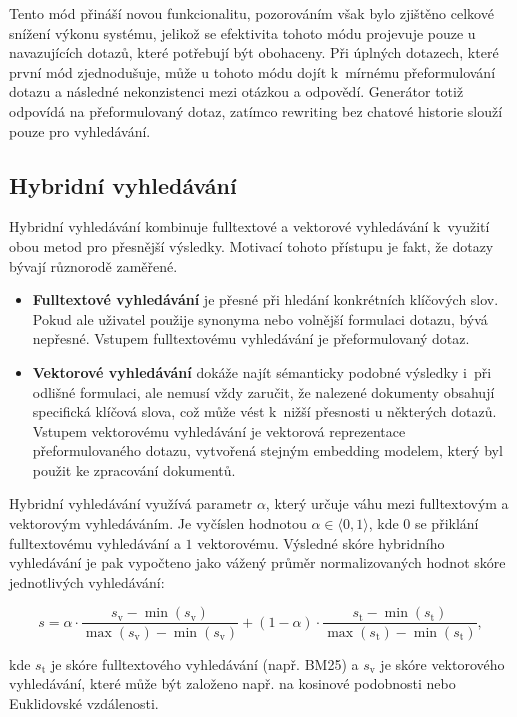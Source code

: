 Tento mód přináší novou funkcionalitu, pozorováním však bylo zjištěno celkové snížení výkonu systému, jelikož se efektivita tohoto módu projevuje pouze u navazujících dotazů, které potřebují být obohaceny. Při úplných dotazech, které první mód zjednodušuje, může u tohoto módu dojít k~mírnému přeformulování dotazu a následné nekonzistenci mezi otázkou a odpovědí. Generátor totiž odpovídá na přeformulovaný dotaz, zatímco rewriting bez chatové historie slouží pouze pro vyhledávání.

\subsection{Hybridní vyhledávání}
\label{hybrid}
Hybridní vyhledávání kombinuje fulltextové a vektorové vyhledávání k~využití obou metod pro přesnější výsledky. Motivací tohoto přístupu je fakt, že dotazy bývají různorodě zaměřené. 
\begin{itemize}
    \item \textbf{Fulltextové vyhledávání} je přesné při hledání konkrétních klíčových slov. Pokud ale uživatel použije synonyma nebo volnější formulaci dotazu, bývá nepřesné. Vstupem fulltextovému vyhledávání je přeformulovaný dotaz.
    \item \textbf{Vektorové vyhledávání} dokáže najít sémanticky podobné výsledky i~při odlišné formulaci, ale nemusí vždy zaručit, že nalezené dokumenty obsahují specifická klíčová slova, což může vést k~nižší přesnosti u některých dotazů. Vstupem vektorovému vyhledávání je vektorová reprezentace přeformulovaného dotazu, vytvořená stejným embedding modelem, který byl použit ke zpracování dokumentů.
\end{itemize}
Hybridní vyhledávání využívá parametr $\alpha$, který určuje váhu mezi fulltextovým a vektorovým vyhledáváním. Je vyčíslen hodnotou $\alpha \in \langle 0, 1 \rangle$, kde $0$ se přiklání fulltextovému vyhledávání a $1$ vektorovému. 
Výsledné skóre hybridního vyhledávání je pak vypočteno jako vážený průměr normalizovaných hodnot skóre jednotlivých vyhledávání:

\begin{equation}
    s = \alpha \cdot \frac{s_{\text{v}} - \min(s_{\text{v}})}{\max(s_{\text{v}}) - \min(s_{\text{v}})} + (1 - \alpha) \cdot \frac{s_{\text{t}} - \min(s_{\text{t}})}{\max(s_{\text{t}}) - \min(s_{\text{t}})},
\end{equation}

\noindent kde $s_{\text{t}}$ je skóre fulltextového vyhledávání (např. BM25) a $s_{\text{v}}$ je skóre vektorového vyhledávání, které může být založeno např. na kosinové podobnosti nebo Euklidovské vzdálenosti.

